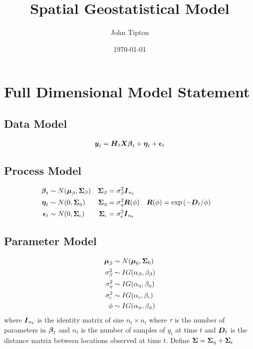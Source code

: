 \documentclass[fleqn]{article}
\title{Spatial Geostatistical Model}
\author{John Tipton}
\date{\today}
\def\bm#1{\mbox{\boldmath $#1$}}
\begin{document}
\maketitle

\section{Full Dimensional Model Statement}
%
\subsection{Data Model}
\begin{align*}
\bm{y}_t & = \bm{H}_t \bm{X} \bm{\beta}_t + \bm{\eta}_t + \bm{\epsilon}_t\\
%
\end{align*}
%
\subsection{Process Model}
%
\begin{align*}
%
\bm{\beta}_t & \sim N(\bm{\mu}_\beta, \bm{\Sigma}_\beta) & \bm{\Sigma}_\beta &  = \sigma^2_\beta \bm{I}_{n_t}\\
%
\bm{\eta}_t & \sim N(0, \bm{\Sigma}_\eta) & \bm{\Sigma}_\eta &  = \sigma^2_\eta \bm{R}(\phi) & \bm{R}(\phi) & = \exp{( - \bm{D}_t / \phi)}\\
%
\bm{\epsilon}_t & \sim N(0, \bm{\Sigma}_\epsilon) & \bm{\Sigma}_\epsilon &  = \sigma^2_\epsilon \bm{I}_{n_t}\\
%
\end{align*}
%
\subsection{Parameter Model}
%
\begin{align*}
%
\bm{\mu}_\beta & \sim N(\bm{\mu}_0, \bm{\Sigma}_0)\\
%
\sigma^2_\beta & \sim IG(\alpha_\beta, \beta_\beta)\\
%
\sigma^2_\eta & \sim IG(\alpha_\eta, \beta_\eta)\\
%
\sigma^2_\epsilon & \sim IG(\alpha_\epsilon, \beta_\epsilon)\\
%
\phi & \sim IG(\alpha_\phi, \beta_\phi)
\end{align*}
%
where $\bm{I}_{n_t}$ is the identity matrix of size $n_t \times n_t$ where $\tau$ is the number of parameters in $\bm{\beta}_t$ and $n_t$ is the number of samples of $y_t$ at time $t$ and $\bm{D}_t$ is the distance matrix between locations observed at time $t$. Define $\bm{\Sigma} = \bm{\Sigma}_\eta + \bm{\Sigma}_\epsilon$
%
\end{document}
